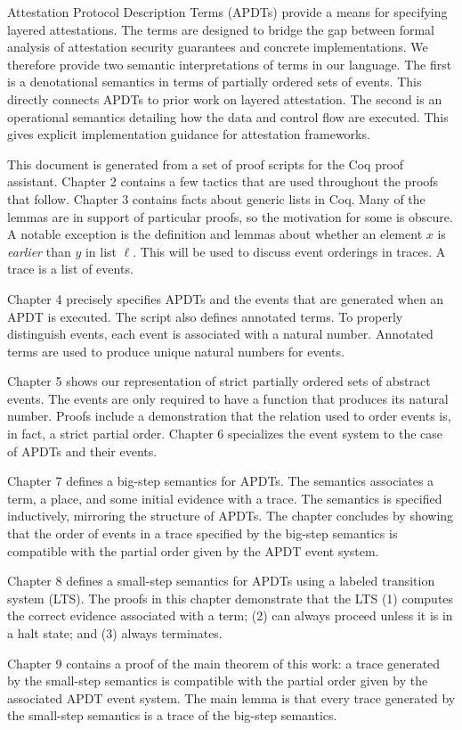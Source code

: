 \documentclass[12pt]{report}
\begin{document}
\tableofcontents


Attestation Protocol Description Terms (APDTs) provide a means for
specifying layered attestations.  The terms are designed to bridge the
gap between formal analysis of attestation security guarantees and
concrete implementations.  We therefore provide two semantic
interpretations of terms in our language.  The first is a denotational
semantics in terms of partially ordered sets of events.  This directly
connects APDTs to prior work on layered attestation.  The second is an
operational semantics detailing how the data and control flow are
executed.  This gives explicit implementation guidance for attestation
frameworks.

This document is generated from a set of proof scripts for the Coq
proof assistant.  Chapter 2 contains a few tactics that are used
throughout the proofs that follow.  Chapter 3 contains facts about
generic lists in Coq.  Many of the lemmas are in support of particular
proofs, so the motivation for some is obscure.  A notable exception
is the definition and lemmas about whether an element $x$ is
\emph{earlier} than $y$ in list $\ell$.  This will be used to discuss
event orderings in traces.  A trace is a list of events.

Chapter 4 precisely specifies APDTs and the events that are generated
when an APDT is executed.  The script also defines annotated terms.
To properly distinguish events, each event is associated with a
natural number.  Annotated terms are used to produce unique natural
numbers for events.

Chapter 5 shows our representation of strict partially ordered sets of
abstract events.  The events are only required to have a function that
produces its natural number.  Proofs include a demonstration that the
relation used to order events is, in fact, a strict partial order.
Chapter 6 specializes the event system to the case of APDTs and their
events.

Chapter 7 defines a big-step semantics for APDTs.  The semantics
associates a term, a place, and some initial evidence with a trace.
The semantics is specified inductively, mirroring the structure of
APDTs.  The chapter concludes by showing that the order of events in a
trace specified by the big-step semantics is compatible with the
partial order given by the APDT event system.

Chapter 8 defines a small-step semantics for APDTs using a labeled
transition system (LTS).  The proofs in this chapter demonstrate that
the LTS (1) computes the correct evidence associated with a term; (2) can
always proceed unless it is in a halt state; and (3) always
terminates.

Chapter 9 contains a proof of the main theorem of this work: a trace
generated by the small-step semantics is compatible with the partial
order given by the associated APDT event system.  The main lemma is
that every trace generated by the small-step semantics is a trace of
the big-step semantics.


\end{document}
